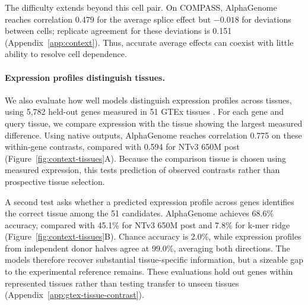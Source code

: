The difficulty extends beyond this cell pair. On COMPASS,
AlphaGenome reaches correlation 0.479 for the average splice effect
but $-0.018$ for deviations between cells; replicate agreement for
these deviations is 0.151 (Appendix~\ref{app:context}).
Thus, accurate average effects can coexist with little ability to
resolve cell dependence.

\paragraph{Expression profiles distinguish tissues.}

We also evaluate how well models distinguish expression profiles across tissues,
using 5,782 held-out genes measured in 51 GTEx tissues \citep{gtex2020atlas}. For each gene and query tissue, we compare
expression with the tissue showing the largest measured difference.
Using native outputs, AlphaGenome reaches correlation 0.775 on these within-gene
contrasts, compared with 0.594 for NTv3 650M post
(Figure~\ref{fig:context-tissues}A). Because the comparison tissue is chosen using measured expression,
this tests prediction of observed contrasts rather than prospective tissue selection.

A second test asks whether a predicted expression profile across
genes identifies the correct tissue among the 51 candidates.
AlphaGenome achieves 68.6\% accuracy, compared with 45.1\% for
NTv3 650M post and 7.8\% for k-mer ridge
(Figure~\ref{fig:context-tissues}B). Chance accuracy is 2.0\%, while
expression profiles from independent donor halves agree at 99.0\%, averaging both directions.
The models therefore recover substantial tissue-specific
information, but a sizeable gap to the experimental reference remains.
These evaluations hold out genes within represented tissues rather than testing transfer to unseen tissues
(Appendix~\ref{app:gtex-tissue-contrast}).


